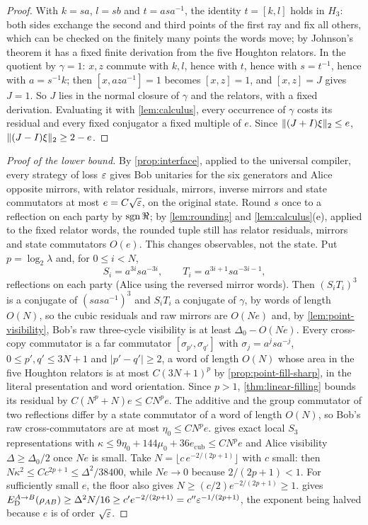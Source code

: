 \begin{proof}
With $k=sa$, $l=sb$ and $t=asa^{-1}$, the identity $t=[k,l]$ holds in $H_3$: both sides exchange the second and third points of
the first ray and fix all others, which can be checked on the finitely many points the words move; by Johnson's theorem it has
a fixed finite derivation from the five Houghton relators. In the quotient by $\gamma=1$: $x,z$ commute with $k,l$, hence with $t$,
hence with $s=t^{-1}$, hence with $a=s^{-1}k$; then $[x,aza^{-1}]=1$ becomes $[x,z]=1$, and $[x,z]=J$ gives $J=1$. So $J$ lies in the
normal closure of $\gamma$ and the relators, with a fixed derivation. Evaluating it with \cref{lem:calculus}, every occurrence of
$\gamma$ costs its residual and every fixed conjugator a fixed multiple of $e$. Since $\lVert (J+I)\xi\rVert_2\le e$, $\lVert (J-I)\xi\rVert_2\ge2-e$.
\end{proof}

\begin{proof}[Proof of the lower bound]
By \cref{prop:interface}, applied to the universal compiler, every strategy of loss $\varepsilon$ gives Bob unitaries for the six
generators and Alice opposite mirrors, with relator residuals, mirrors, inverse mirrors and state commutators at most
$e=C\sqrt{\varepsilon}$, on the original state. Round $s$ once to a reflection on each party by $\operatorname{sgn}\Re$; by \cref{lem:rounding} and
\cref{lem:calculus}(e), applied to the fixed relator words, the rounded tuple still has relator residuals, mirrors and state
commutators $O(e)$. This changes observables, not the state. Put $p=\log_2\lambda$ and, for $0\le i<N$,
\[
S_i=a^{3i}sa^{-3i},\qquad T_i=a^{3i+1}sa^{-3i-1},
\]
reflections on each party (Alice using the reversed mirror words). Then $(S_iT_i)^3$ is a conjugate of $(sasa^{-1})^3$ and
$S_iT_i$ a conjugate of $\gamma$, by words of length $O(N)$, so the cubic residuals and raw mirrors are $O(Ne)$ and, by
\cref{lem:point-visibility}, Bob's raw three-cycle visibility is at least $\Delta_0-O(Ne)$. Every cross-copy commutator is a far
commutator $[\sigma_{p'},\sigma_{q'}]$ with $\sigma_j=a^jsa^{-j}$, $0\le p',q'\le3N+1$ and $|p'-q'|\ge2$, a word of length $O(N)$
whose area in the five Houghton relators is at most $C(3N+1)^p$ by \cref{prop:point-fill-sharp}, in the literal presentation and word orientation. Since $p>1$, \cref{thm:linear-filling} bounds its residual by $C(N^p+N)e\le CN^pe$. The additive and the group
commutator of two reflections differ by a state commutator of a word of length $O(N)$, so Bob's raw cross-commutators are at most
$\eta_0\le CN^pe$.  gives exact local $S_3$ representations with
$\kappa\le9\eta_0+144\mu_0+36e_{\mathrm{cub}}\le CN^pe$ and Alice visibility $\Delta\ge\Delta_0/2$ once $Ne$ is small. Take
$N=\lfloor c\,e^{-2/(2p+1)}\rfloor$ with $c$ small: then $N\kappa^2\le Cc^{2p+1}\le\Delta^2/38400$, while $Ne\to0$ because
$2/(2p+1)<1$. For sufficiently small $e$, the floor also gives $N\ge(c/2)e^{-2/(2p+1)}\ge1$.  gives $E_{\mathrm D}^{A\to B}(\rho_{AB})\ge\Delta^2N/16\ge c'e^{-2/(2p+1)}=c''\varepsilon^{-1/(2p+1)}$, the exponent
being halved because $e$ is of order $\sqrt{\varepsilon}$.
\end{proof}

